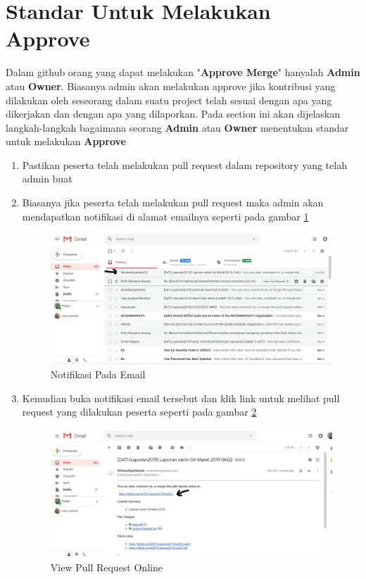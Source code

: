 \section{Standar Untuk Melakukan Approve}
Dalam github orang yang dapat melakukan "\textbf{Approve Merge}" hanyalah  \textbf{Admin} atau \textbf{Owner}. Biasanya admin akan melakukan approve jika kontribusi yang dilakukan oleh seseorang dalam suatu project telah sesuai dengan apa yang dikerjakan dan dengan apa yang dilaporkan.
Pada section ini akan dijelaskan langkah-langkah bagaimana seorang \textbf{Admin} atau \textbf{Owner} menentukan standar untuk melakukan \textbf{Approve} 
\begin{enumerate}
\item Pastikan peserta telah melakukan pull request dalam repository yang telah admin buat
\item Biasanya jika peserta telah melakukan pull request maka admin akan mendapatkan notifikasi di alamat emailnya seperti pada gambar 
\ref{fig:notif}
\subitem
\begin{figure}[!htbp]
\centerline{\includegraphics[width=.75\textwidth]{Figures/membacapr/mr1.JPG}}
\caption{Notifikasi Pada Email}
\label{fig:notif}
\end{figure}
\item Kemudian buka notifikasi email tersebut dan klik link untuk melihat pull request yang dilakukan peserta seperti pada gambar \ref{fig:link}
\subitem
\begin{figure}[!htbp]
\centerline{\includegraphics[width=.75\textwidth]{Figures/membacapr/mr2.JPG}}
\caption{View Pull Request Online}
\label{fig:link}

\end{figure}
\end{enumerate}
